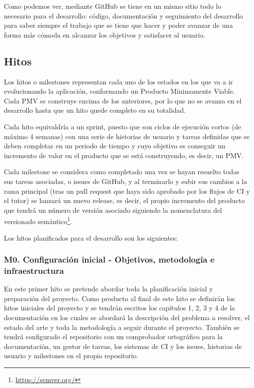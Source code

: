 Como podemos ver, mediante GitHub se tiene en un mismo sitio todo lo necesario para el desarrollo: código, documentación y seguimiento del desarrollo para saber siempre el trabajo que se tiene que hacer y poder avanzar de una forma más cómoda en alcanzar los objetivos y satisfacer al usuario. 

\subsection{Hitos}
Los hitos o milestones representan cada uno de los estados en los que va a ir evolucionando la aplicación, conformando un Producto Mínimamente Viable. Cada PMV se construye encima de los anteriores, por lo que no se avanza en el desarrollo hasta que un hito quede completo en su totalidad. 

Cada hito equivaldría a un sprint, puesto que son ciclos de ejecución cortos (de máximo 4 semanas) con una serie de historias de usuario y tareas definidas que se deben completar en un periodo de tiempo y cuyo objetivo es conseguir un incremento de valor en el producto que se está construyendo, es decir, un PMV.

Cada milestone se considera como completado una vez se hayan resuelto todas sus tareas asociadas, o issues de GitHub, y al terminarlo y subir sus cambios a la rama principal (tras un pull request que haya sido aprobado por los flujos de CI y el tutor) se lanzará un nuevo release, es decir, el propio incremento del producto que tendrá un número de versión asociado siguiendo la nomenclatura del versionado semántico\footnote{\url{https://semver.org/}}.

Los hitos planificados para el desarrollo son los siguientes:

\subsubsection{M0. Configuración inicial - Objetivos, metodología e infraestructura}
En este primer hito se pretende abordar toda la planificación inicial y preparación del proyecto. Como producto al final de este hito se definirán los hitos iniciales del proyecto y se tendrán escritos los capítulos 1, 2, 3 y 4 de la documentación en los cuales se abordará la descripción del problema a resolver, el estado del arte y toda la metodología a seguir durante el proyecto. También se tendrá configurado el repositorio con un comprobador ortográfico para la documentación, un gestor de tareas, los sistemas de CI y los issues, historias de usuario y milestones en el propio repositorio.\\

